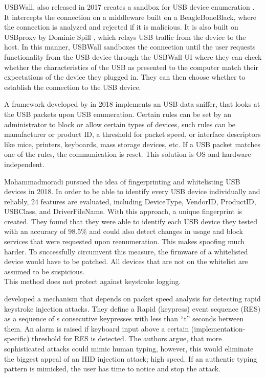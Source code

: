 USBWall, also released in 2017 creates a sandbox for USB device enumeration \cite{kangUSBWallNovelSecurity2017}. It intercepts the connection on a middleware built on a BeagleBoneBlack, where the connection is analyzed and rejected if it is malicious. It is also built on USBproxy by Dominic Spill \cite{dominicspillShmooCon2014Open2014}, which relays USB traffic from the device to the host. In this manner, USBWall sandboxes the connection until the user requests functionality from the USB device through the USBWall UI where they can check whether the characteristics of the USB as presented to the computer match their expectations of the device they plugged in. They can then choose whether to establish the connection to the USB device.  

A framework developed by \cite{erdinOSIndependentHardwareAssisted2018} in 2018 implements an USB data sniffer, that looks at the USB packets upon USB enumeration. Certain rules can be set by an administrator to block or allow certain types of devices, such rules can be manufacturer or product ID, a threshold for packet speed, or interface descriptors like mice, printers, keyboards, mass storage devices, etc. If a USB packet matches one of the rules, the communication is reset. This solution is OS and hardware independent. 

Mohammadmoradi \cite{mohammadmoradiMakingWhitelistingBasedDefense2018} pursued the idea of fingerprinting and whitelisting USB devices in 2018. In order to be able to identify every USB device individually and reliably, 24 features are evaluated, including DeviceType, VendorID, ProductID, USBClass, and DriverFileName. With this approach, a unique fingerprint is created. They found that they were able to identify each USB device they tested with an accuracy of 98.5\%  and could also detect changes in usage and block services that were requested upon reenumeration. This makes spoofing much harder. To successfully circumvent this measure, the firmware of a whitelisted device would have to be patched. All devices that are not on the whitelist are assumed to be suspicious. \\
This method does not protect against keystroke logging. 

\cite{neunerUSBlockBlockingUSBBased2018} developed a mechanism that depends on packet speed analysis for detecting rapid keystroke injection attacks. They define a Rapid (keypress) event sequence (RES) as a sequence of s consecutive keypresses with less than ``t'' seconds between them. An alarm is raised if keyboard input above a certain (implementation-specific) threshold for RES is detected. The authors argue, that more sophisticated attacks could mimic human typing, however, this would eliminate the biggest appeal of an HID injection attack; high speed. If an authentic typing pattern is mimicked, the user has time to notice and stop the attack.

